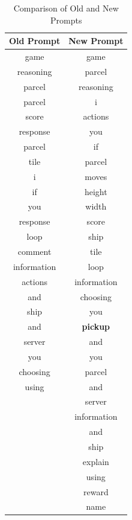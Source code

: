 \begin{table}[h]
  \centering
  \begin{tabular}{|c|c|}
    \hline
    \textbf{Old Prompt} & \textbf{New Prompt} \\
    \hline
    game                & game                \\
    reasoning           & parcel              \\
    parcel              & reasoning           \\
    parcel              & i                   \\
    score               & actions             \\
    response            & you                 \\
    parcel              & if                  \\
    tile                & parcel              \\
    i                   & moves               \\
    if                  & height              \\
    you                 & width               \\
    response            & score               \\
    loop                & ship                \\
    comment             & tile                \\
    information         & loop                \\
    actions             & information         \\
    and                 & choosing            \\
    ship                & you                 \\
    and                 & \textbf{pickup}     \\
    server              & and                 \\
    you                 & you                 \\
    choosing            & parcel              \\
    using               & and                 \\
                        & server              \\
                        & information         \\
                        & and                 \\
                        & ship                \\
                        & explain             \\
                        & using               \\
                        & reward              \\
                        & name                \\
    \hline
  \end{tabular}
  \caption{Comparison of Old and New Prompts}
  \label{tab:prompt_comparison}
\end{table}

